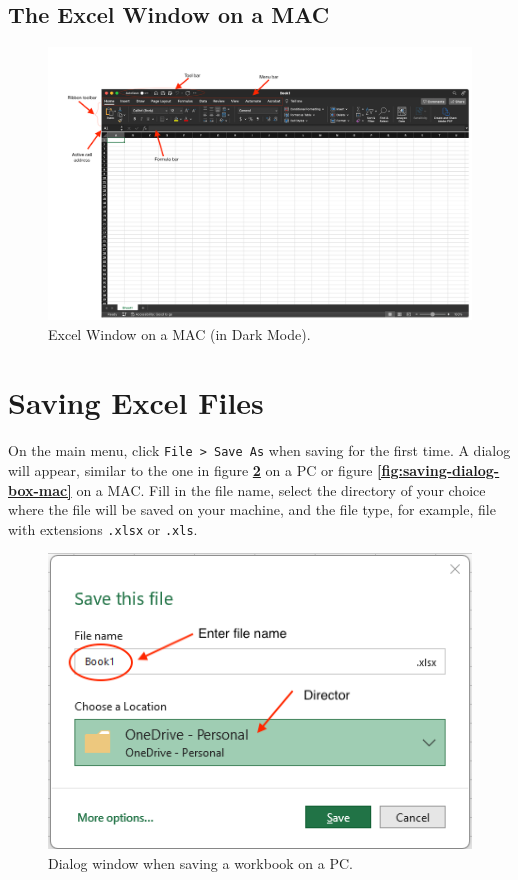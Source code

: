 \documentclass[
]{book}
\begin{document}
\hypertarget{the-excel-window-on-a-mac}{%
\subsection{The Excel Window on a MAC}\label{the-excel-window-on-a-mac}}

\begin{figure}

{\centering \includegraphics[width=1\linewidth]{images/window-mac} 

}

\caption{Excel Window on a MAC (in Dark Mode).}\label{fig:window-mac}
\end{figure}

\hypertarget{saving-excel-files}{%
\section{Saving Excel Files}\label{saving-excel-files}}

On the main menu, click \texttt{File\ \textgreater{}\ Save\ As} when saving for the first time. A dialog will appear, similar to the one in figure \textbf{\ref{fig:saving-dialog-box-pc}} on a PC or figure \textbf{\ref{fig:saving-dialog-box-mac}} on a MAC. Fill in the file name, select the directory of your choice where the file will be saved on your machine, and the file type, for example, file with extensions \texttt{.xlsx} or \texttt{.xls}.

\begin{figure}

{\centering \includegraphics[width=0.45\linewidth]{images/saving-pc2} 

}

\caption{Dialog window when saving a workbook on a PC.}\label{fig:saving-dialog-box-pc}
\end{figure}
\end{document}

